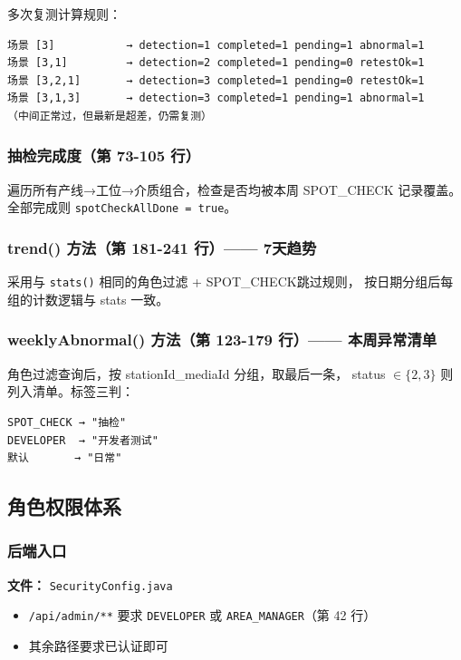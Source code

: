\documentclass[12pt,a4paper]{ctexart}
\begin{document}
多次复测计算规则：
\begin{verbatim}
场景 [3]           → detection=1 completed=1 pending=1 abnormal=1
场景 [3,1]         → detection=2 completed=1 pending=0 retestOk=1
场景 [3,2,1]       → detection=3 completed=1 pending=0 retestOk=1
场景 [3,1,3]       → detection=3 completed=1 pending=1 abnormal=1
（中间正常过，但最新是超差，仍需复测）
\end{verbatim}

\subsubsection{抽检完成度（第 73-105 行）}

遍历所有产线→工位→介质组合，检查是否均被本周 SPOT\_CHECK 记录覆盖。
全部完成则 \texttt{spotCheckAllDone = true}。

\subsubsection{trend() 方法（第 181-241 行）—— 7天趋势}

采用与 \texttt{stats()} 相同的角色过滤 + SPOT\_CHECK跳过规则，
按日期分组后每组的计数逻辑与 stats 一致。

\subsubsection{weeklyAbnormal() 方法（第 123-179 行）—— 本周异常清单}

角色过滤查询后，按 stationId\_mediaId 分组，取最后一条，
status $\in \{2, 3\}$ 则列入清单。标签三判：
\begin{verbatim}
SPOT_CHECK → "抽检"
DEVELOPER  → "开发者测试"
默认       → "日常"
\end{verbatim}

\subsection{角色权限体系}

\subsubsection{后端入口}

\textbf{文件：} \texttt{SecurityConfig.java}

\begin{itemize}
    \item \texttt{/api/admin/**} 要求 \texttt{DEVELOPER} 或 \texttt{AREA\_MANAGER}（第 42 行）
    \item 其余路径要求已认证即可
\end{itemize}
\end{document}
